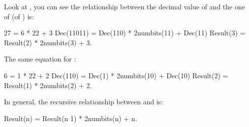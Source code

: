 \documentclass[letterpaper,12pt,english]{book}
\begin{document}
\sphinxAtStartPar
Look at , you can see the relationship between the decimal value of  and the one of  (of ) is:

\begin{sphinxVerbatim}[commandchars=\\\{\}]
27 = 6 * 2\PYGZca{}2 + 3
Dec(\PYGZdq{}11011\PYGZdq{}) = Dec(\PYGZdq{}110\PYGZdq{}) * 2\PYGZca{}num\PYGZus{}bits(\PYGZdq{}11\PYGZdq{}) + Dec(\PYGZdq{}11\PYGZdq{})
Result(3) = Result(2) * 2\PYGZca{}num\PYGZus{}bits(3) + 3.
\end{sphinxVerbatim}

\sphinxAtStartPar
The same equation for :

\begin{sphinxVerbatim}[commandchars=\\\{\}]
6 = 1 * 2\PYGZca{}2 + 2
Dec(\PYGZdq{}110\PYGZdq{}) = Dec(\PYGZdq{}1\PYGZdq{}) * 2\PYGZca{}num\PYGZus{}bits(\PYGZdq{}10\PYGZdq{}) + Dec(\PYGZdq{}10\PYGZdq{})
Result(2) = Result(1) * 2\PYGZca{}num\PYGZus{}bits(2) + 2.
\end{sphinxVerbatim}

\sphinxAtStartPar
In general, the recursive relationship between  and  is:

\begin{sphinxVerbatim}[commandchars=\\\{\}]
Result(n) = Result(n \PYGZhy{} 1) * 2\PYGZca{}num\PYGZus{}bits(n) + n.
\end{sphinxVerbatim}
\end{document}
